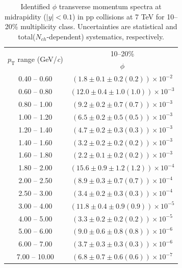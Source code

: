 \begin{table}
\caption{Identified $\phi$ transverse momentum spectra at midrapidity ($|y|<0.1$) in pp collisions at 7 TeV for 10--20\% multiplicity class. Uncertainties are statistical and total($N_{ch}$-dependent) systematics, respectively.}
\label{tab:Phi_10to20}
\begin{center}
\begin{tabular}{ c | c }
\hline
\multirow{2}{*}{$p_{\mathrm{T}}$ range (GeV/\textit{c})} & \multicolumn{1}{c}{10--20\%} \\ & $\phi$\\ 
\hline
0.40 -- 0.60 & $(1.8\pm0.1\pm0.2(0.2))\times10^{-2}$ \\ 
0.60 -- 0.80 & $(12.0\pm0.4\pm1.0(1.0))\times10^{-3}$ \\ 
0.80 -- 1.00 & $(9.2\pm0.2\pm0.7(0.7))\times10^{-3}$ \\ 
1.00 -- 1.20 & $(6.5\pm0.2\pm0.5(0.5))\times10^{-3}$ \\ 
1.20 -- 1.40 & $(4.7\pm0.2\pm0.3(0.3))\times10^{-3}$ \\ 
1.40 -- 1.60 & $(3.2\pm0.2\pm0.2(0.2))\times10^{-3}$ \\ 
1.60 -- 1.80 & $(2.2\pm0.1\pm0.2(0.2))\times10^{-3}$ \\ 
1.80 -- 2.00 & $(15.6\pm0.9\pm1.2(1.2))\times10^{-4}$ \\ 
2.00 -- 2.50 & $(8.9\pm0.3\pm0.7(0.7))\times10^{-4}$ \\ 
2.50 -- 3.00 & $(3.4\pm0.2\pm0.3(0.3))\times10^{-4}$ \\ 
3.00 -- 4.00 & $(11.8\pm0.4\pm0.9(0.9))\times10^{-5}$ \\ 
4.00 -- 5.00 & $(3.3\pm0.2\pm0.2(0.2))\times10^{-5}$ \\ 
5.00 -- 6.00 & $(9.0\pm0.6\pm0.8(0.8))\times10^{-6}$ \\ 
6.00 -- 7.00 & $(3.7\pm0.3\pm0.3(0.3))\times10^{-6}$ \\ 
7.00 -- 10.00 & $(6.8\pm0.7\pm0.6(0.6))\times10^{-7}$ \\ 
\hline
\end{tabular}
\end{center}
\end{table}
 
